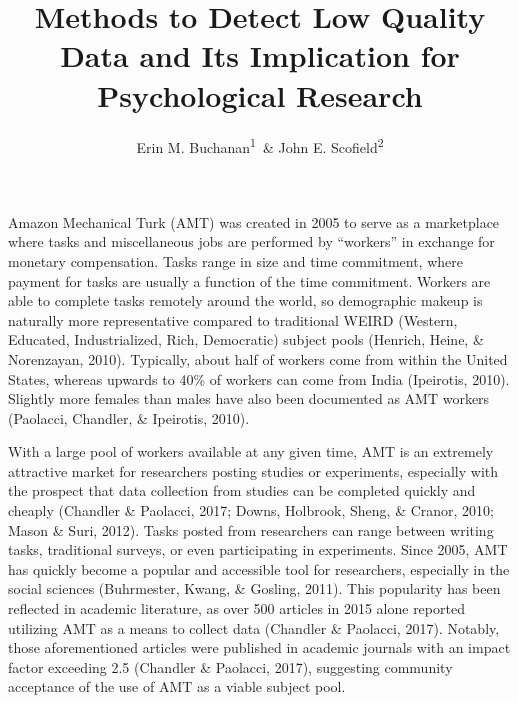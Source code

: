 \documentclass[english,man]{apa6}
\title{Methods to Detect Low Quality Data and Its Implication for Psychological
Research}
\author{Erin M. Buchanan\textsuperscript{1}~\& John E. Scofield\textsuperscript{2}}
\affiliation{
    \vspace{0.5cm}
          \textsuperscript{1} Missouri State University\\
          \textsuperscript{2} University of Missouri  }
\theoremstyle{definition}
\theoremstyle{definition}
\theoremstyle{definition}
\theoremstyle{remark}
\begin{document}
\maketitle

\setcounter{secnumdepth}{0}



Amazon Mechanical Turk (AMT) was created in 2005 to serve as a
marketplace where tasks and miscellaneous jobs are performed by
\enquote{workers} in exchange for monetary compensation. Tasks range in
size and time commitment, where payment for tasks are usually a function
of the time commitment. Workers are able to complete tasks remotely
around the world, so demographic makeup is naturally more representative
compared to traditional WEIRD (Western, Educated, Industrialized, Rich,
Democratic) subject pools (Henrich, Heine, \& Norenzayan, 2010).
Typically, about half of workers come from within the United States,
whereas upwards to 40\% of workers can come from India (Ipeirotis,
2010). Slightly more females than males have also been documented as AMT
workers (Paolacci, Chandler, \& Ipeirotis, 2010).

With a large pool of workers available at any given time, AMT is an
extremely attractive market for researchers posting studies or
experiments, especially with the prospect that data collection from
studies can be completed quickly and cheaply (Chandler \& Paolacci,
2017; Downs, Holbrook, Sheng, \& Cranor, 2010; Mason \& Suri, 2012).
Tasks posted from researchers can range between writing tasks,
traditional surveys, or even participating in experiments. Since 2005,
AMT has quickly become a popular and accessible tool for researchers,
especially in the social sciences (Buhrmester, Kwang, \& Gosling, 2011).
This popularity has been reflected in academic literature, as over 500
articles in 2015 alone reported utilizing AMT as a means to collect data
(Chandler \& Paolacci, 2017). Notably, those aforementioned articles
were published in academic journals with an impact factor exceeding 2.5
(Chandler \& Paolacci, 2017), suggesting community acceptance of the use
of AMT as a viable subject pool.
\end{document}

